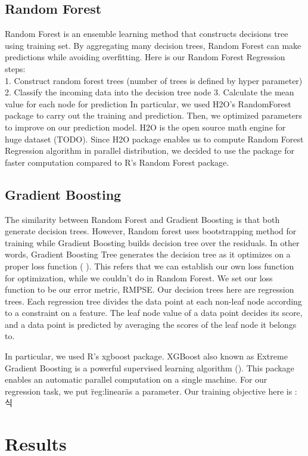 \documentclass[letterpaper,twocolumn,10pt]{article}
\begin{document}
\subsection{Random Forest}
Random Forest is an ensemble learning method that constructs decisions tree using training set. By aggregating many decision trees, Random Forest can make predictions while avoiding overfitting. Here is our Random Forest Regression steps: \\
1. Construct random forest trees (number of trees is defined by hyper parameter)
2. Classify the incoming data into the decision tree node
3. Calculate the mean value for each node for prediction
In particular, we used H2O’s RandomForest package to carry out the training and prediction. Then, we optimized parameters to improve on our prediction model. H2O is the open source math engine for huge dataset (TODO). Since H2O package enables us to compute Random Forest Regression algorithm in parallel distribution, we decided to use the package for faster computation compared to R's Random Forest package.



\subsection{Gradient Boosting}
The similarity between Random Forest and Gradient Boosting is that both generate decision trees. However, Random forest uses bootstrapping method for training while Gradient Boosting builds decision tree over the residuals. In other words, Gradient Boosting Tree generates the decision tree as it optimizes on a proper loss function (   ). This refers that we can establish our own loss function for optimization, while we couldn't do in Random Forest. We set our loss function to be our error metric, RMPSE. Our decision trees here are regression trees. Each regression tree divides the data point at each non-leaf node according to a constraint on a feature. The leaf node value of a data point decides its score, and a data point is predicted by averaging the scores of the leaf node it belongs to.

In particular, we used R's xgboost package. XGBoost also known as Extreme Gradient Boosting is a powerful supervised learning algorithm (). This package enables an automatic parallel computation on a single machine. For our regression task, we put \"reg:linear\" as a parameter. Our training objective here is : 식 




\section{Results}
\end{document}
